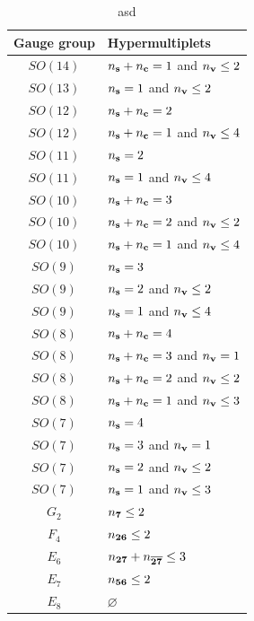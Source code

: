 \documentclass[letterpaper, 11pt]{article}
\begin{document}
\begin{table}[tbp]
  \centering
  \begin{tabular}{@{}cl@{}}
    \toprule
    Gauge group  & Hypermultiplets    \\  \midrule
    $SO(14)$  & $n_{\bf s} + n_{\bf c} = 1$ and $n_{\bf v}  \leq 2$ \\
    $SO(13)$  & $n_{\bf s} = 1$ and $n_{\bf v}  \leq 2$ \\
    $SO(12)$  & $n_{\bf s} + n_{\bf c} = 2$ \\
    $SO(12)$  & $n_{\bf s} + n_{\bf c} = 1$ and  $n_{\bf v}  \leq 4$\\
    $SO(11)$  & $n_{\bf s}= 2$ \\
    $SO(11)$  & $n_{\bf s}= 1$ and  $n_{\bf v}  \leq 4$\\
    $SO(10)$  & $n_{\bf s} + n_{\bf c} = 3$ \\
    $SO(10)$  & $n_{\bf s} + n_{\bf c} = 2$ and  $n_{\bf v}  \leq 2$\\
    $SO(10)$  & $n_{\bf s} + n_{\bf c} = 1$ and  $n_{\bf v}  \leq 4$\\
    $SO(9)$  & $n_{\bf s}  = 3$ \\
    $SO(9)$  & $n_{\bf s}  = 2$ and  $n_{\bf v}  \leq 2$\\
    $SO(9)$  & $n_{\bf s} = 1$ and  $n_{\bf v}  \leq 4$\\
    $SO(8)$  & $n_{\bf s} + n_{\bf c} = 4$ \\
    $SO(8)$  & $n_{\bf s} + n_{\bf c} = 3$ and  $n_{\bf v}  =1$\\
    $SO(8)$  & $n_{\bf s} + n_{\bf c} = 2$ and  $n_{\bf v}  \leq 2$\\
    $SO(8)$  & $n_{\bf s} + n_{\bf c} = 1$ and  $n_{\bf v}  \leq 3$\\
    $SO(7)$  & $n_{\bf s} = 4$ \\
    $SO(7)$  & $n_{\bf s} = 3$ and  $n_{\bf v}  =1$\\
    $SO(7)$  & $n_{\bf s} = 2$ and  $n_{\bf v}  \leq 2$\\
    $SO(7)$  & $n_{\bf s} = 1$ and  $n_{\bf v}  \leq 3$\\
    $G_2$  & $n_{\bf 7}\leq 2$ \\
    $F_4$  & $n_{\bf 26}\leq 2$ \\
    $E_6$  & $n_{\bf 27}+ n_{\bf \overline{27}} \leq 3$\\
    $E_7$  & $n_{\bf 56} \leq 2$ \\ 
    $E_8$  & $\varnothing$ \\ \bottomrule
    \end{tabular}
    \caption{asd}
    \label{tbl:exceptional-theory}
\end{table}
\end{document}

